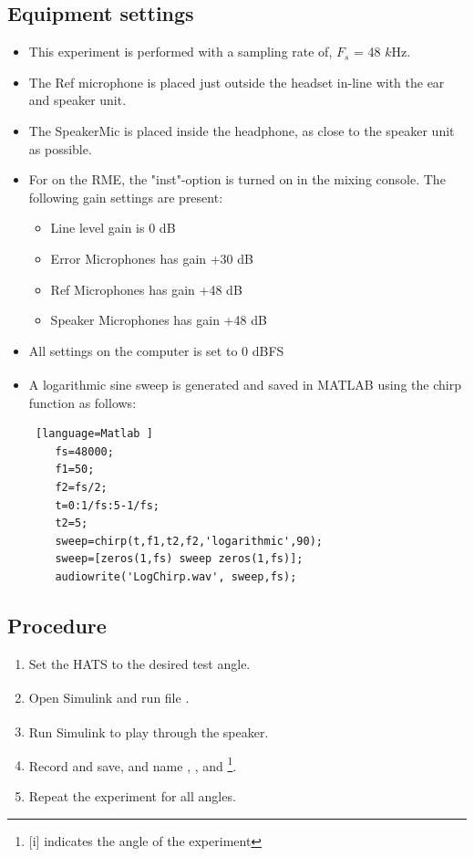\subsection{Equipment settings}
\begin{itemize}
	\item This experiment is performed with a sampling rate of, $F_{s}$ = 48 $k$Hz.
	\item The Ref microphone is placed just outside the headset in-line with the ear and speaker unit. 
	\item The SpeakerMic is placed inside the headphone, as close to the speaker unit as possible. 
	\item For on the RME, the "inst"-option is turned on in the mixing console. The following gain settings are present: 		
	\begin{itemize}
		\item Line level gain is 0 dB
		\item Error Microphones has gain +30 dB
		\item Ref Microphones has gain +48 dB
		\item Speaker Microphones has gain +48 dB
	\end{itemize}
	\item All settings on the computer is set to 0 dBFS
	\item A logarithmic sine sweep is generated and saved in MATLAB\textsuperscript{\textregistered} using the chirp function as follows:
	\begin{lstlisting} [language=Matlab	]
	fs=48000;
	f1=50;
	f2=fs/2;
	t=0:1/fs:5-1/fs;
	t2=5;
	sweep=chirp(t,f1,t2,f2,'logarithmic',90);
	sweep=[zeros(1,fs) sweep zeros(1,fs)];
	audiowrite('LogChirp.wav', sweep,fs);
	\end{lstlisting}
\end{itemize}



\subsection{Procedure}
\begin{enumerate}
	\item Set the HATS to the desired test angle. 
	\item Open Simulink\textsuperscript{\textregistered} and run file .
	\item Run Simulink\textsuperscript{\textregistered} to play  through the speaker.
	\item Record and save, and name , ,  and \footnote{[i] indicates the angle of the experiment}.
	\item Repeat the experiment for all angles.
\end{enumerate}

